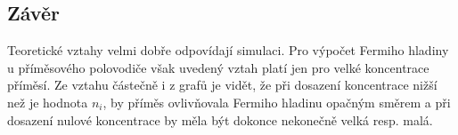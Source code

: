 \documentclass{article}
\begin{document}
\begin{figure}[H]
\begin{minipage}[t]{0.52\textwidth}
    \end{minipage}
\end{figure}

\subsection*{Závěr}
Teoretické vztahy velmi dobře odpovídají simulaci.
Pro výpočet Fermiho hladiny u příměsového polovodiče však uvedený vztah platí jen pro velké koncentrace příměsí.
Ze vztahu částečně i z grafů je vidět, že při dosazení koncentrace nižší než je hodnota \(n_i\), by příměs ovlivňovala Fermiho hladinu opačným směrem a při dosazení nulové koncentrace by měla být dokonce nekonečně velká resp. malá.
\end{document}
